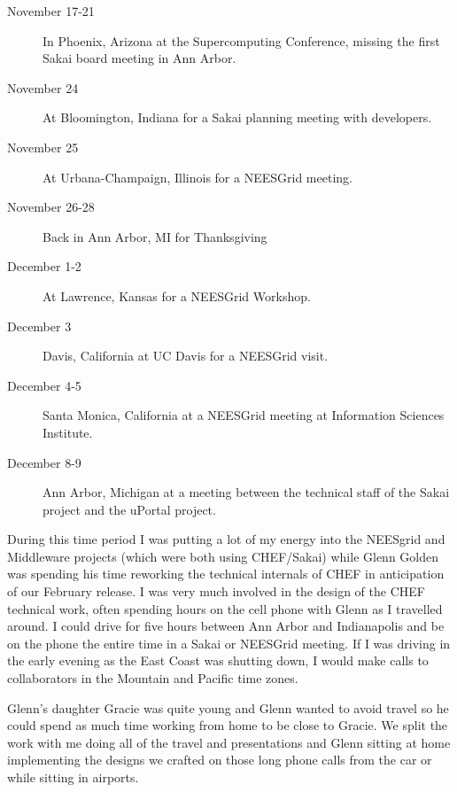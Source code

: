 \documentclass[12pt]{book}
\begin{document}
\begin{description}

\item[November 17-21] In Phoenix, Arizona at the Supercomputing Conference,
missing the first Sakai board meeting in Ann Arbor.

\item[November 24] At Bloomington, Indiana for a Sakai planning meeting with
developers.

\item[November 25] At Urbana-Champaign, Illinois for a NEESGrid meeting.

\item[November 26-28] Back in Ann Arbor, MI for Thanksgiving

\item[December 1-2] At Lawrence, Kansas for a NEESGrid Workshop.

\item[December 3] Davis, California at UC Davis for a NEESGrid
visit.

\item[December 4-5] Santa Monica, California at a NEESGrid meeting at Information
Sciences Institute.

\item[December 8-9] Ann Arbor, Michigan at a meeting between the technical staff
of the Sakai project and the uPortal project.

\end{description}

During this time period I was putting a lot of my energy into the NEESgrid and Middleware
projects (which were both using CHEF\slash Sakai) while Glenn Golden was spending his time
reworking the technical internals of CHEF in anticipation of our February release.
I was very much involved in the design of the CHEF technical work,
often spending hours on the cell phone with Glenn as I travelled around.
I could drive for five hours between Ann Arbor and Indianapolis and be on the phone
the entire time in a Sakai or NEESGrid meeting.
If I was driving in the early evening as the East Coast was shutting down, I
would make calls to collaborators in the Mountain and Pacific time zones.

Glenn's daughter Gracie was quite young and Glenn wanted to avoid travel
so he could spend as much time working from home to be close to Gracie.  We split the work
with me doing all of the travel and presentations and Glenn sitting at home
implementing the designs we crafted on those long phone calls from the car or
while sitting in airports.
\end{document}
